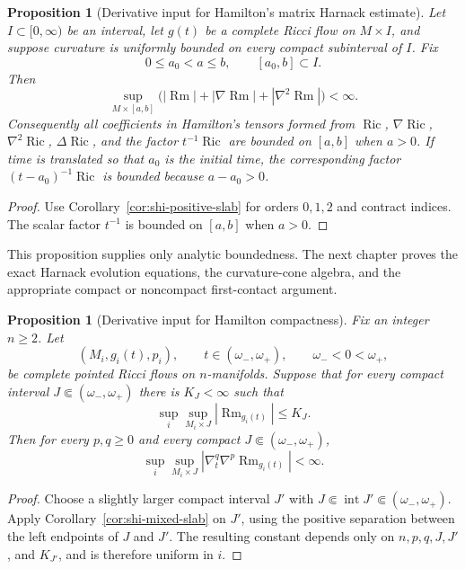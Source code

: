 \documentclass[10pt]{coll-l}
\newtheorem{proposition}[theorem]{Proposition}
\theoremstyle{definition}
\theoremstyle{remark}
\numberwithin{section}{chapter}
\numberwithin{equation}{chapter}
\newcommand{\Ric}{\operatorname{Ric}}
\newcommand{\Rm}{\operatorname{Rm}}
\begin{document}
\begin{proposition}[Derivative input for Hamilton's matrix Harnack estimate]
\label{prop:shi-harnack-input}
Let $I\subset[0,\infty)$ be an interval, let $g(t)$ be a complete Ricci flow
on $M\times I$, and suppose curvature is uniformly bounded on every compact
subinterval of $I$.  Fix
\[
             0\leq a_0<a\leq b,
             \qquad [a_0,b]\subset I.
\]
Then
\begin{equation}
       \sup_{M\times[a,b]}
        \bigl(|\Rm|+|\nabla\Rm|+|\nabla^2\Rm|\bigr)<\infty.             \label{eq:shi-harnack-input}
\end{equation}
Consequently all coefficients in Hamilton's tensors formed from
$\Ric$, $\nabla\Ric$, $\nabla^2\Ric$, $\Delta\Ric$, and the factor
$t^{-1}\Ric$ are bounded on $[a,b]$ when $a>0$.  If time is translated so
that $a_0$ is the initial time, the corresponding factor
$(t-a_0)^{-1}\Ric$ is bounded because $a-a_0>0$.
\end{proposition}

\begin{proof}
Use Corollary~\ref{cor:shi-positive-slab} for orders $0,1,2$ and contract
indices.  The scalar factor $t^{-1}$ is bounded on $[a,b]$ when $a>0$.
\end{proof}

This proposition supplies only analytic boundedness.  The next chapter
proves the exact Harnack evolution equations, the curvature-cone algebra,
and the appropriate compact or noncompact first-contact argument.

\begin{proposition}[Derivative input for Hamilton compactness]
\label{prop:shi-compactness-input}
Fix an integer $n\geq2$.  Let
\[
   (M_i,g_i(t),p_i),\qquad t\in(\omega_-,\omega_+),
   \qquad \omega_-<0<\omega_+,
\]
be complete pointed Ricci flows on $n$-manifolds.  Suppose that for every compact interval
$J\Subset(\omega_-,\omega_+)$ there is $K_J<\infty$ such that
\[
             \sup_i\sup_{M_i\times J}|\Rm_{g_i(t)}|\leq K_J.
\]
Then for every $p,q\geq0$ and every compact
$J\Subset(\omega_-,\omega_+)$,
\begin{equation}
       \sup_i\sup_{M_i\times J}
          |\nabla_t^q\nabla^p\Rm_{g_i(t)}|<\infty.       \label{eq:shi-compactness-derivatives}
\end{equation}
\end{proposition}

\begin{proof}
Choose a slightly larger compact interval $J'$ with
$J\Subset\operatorname{int}J'\Subset(\omega_-,\omega_+)$.  Apply
Corollary~\ref{cor:shi-mixed-slab} on $J'$, using the positive separation
between the left endpoints of $J$ and $J'$.  The resulting constant depends
only on $n,p,q,J,J'$, and $K_{J'}$, and is therefore uniform in $i$.
\end{proof}
\end{document}
